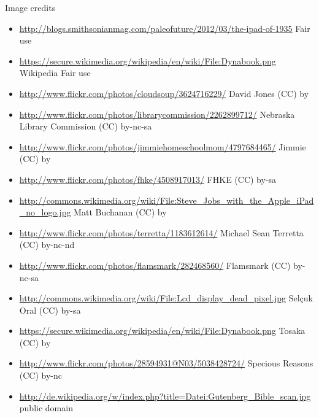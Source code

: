 \begin{frame}[plain]
  Image credits
  \tiny
  \begin{itemize}
    \item \url{http://blogs.smithsonianmag.com/paleofuture/2012/03/the-ipad-of-1935} Fair use
    \item \url{https://secure.wikimedia.org/wikipedia/en/wiki/File:Dynabook.png} Wikipedia Fair use
    \item \url{http://www.flickr.com/photos/cloudsoup/3624716229/} David Jones (CC) by
    \item \url{http://www.flickr.com/photos/librarycommission/2262899712/} Nebraska Library Commission (CC) by-nc-sa
    \item \url{http://www.flickr.com/photos/jimmiehomeschoolmom/4797684465/} Jimmie (CC) by
    \item \url{http://www.flickr.com/photos/fhke/4508917013/} FHKE (CC) by-sa
    \item \url{http://commons.wikimedia.org/wiki/File:Steve_Jobs_with_the_Apple_iPad_no_logo.jpg} Matt Buchanan (CC) by
    \item \url{http://www.flickr.com/photos/terretta/1183612614/} Michael Sean Terretta (CC) by-nc-nd
    \item \url{http://www.flickr.com/photos/flamsmark/282468560/} Flamsmark (CC) by-nc-sa
    \item \url{http://commons.wikimedia.org/wiki/File:Lcd_display_dead_pixel.jpg} Selçuk Oral (CC) by-sa
    \item \url{https://secure.wikimedia.org/wikipedia/en/wiki/File:Dynabook.png} Tosaka (CC) by
    \item \url{http://www.flickr.com/photos/28594931@N03/5038428724/} Specious Reasons (CC) by-nc
    \item \url{http://de.wikipedia.org/w/index.php?title=Datei:Gutenberg_Bible_scan.jpg} public domain
  \end{itemize}
\end{frame}
